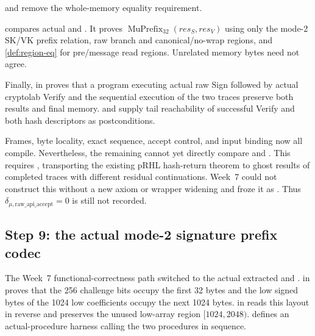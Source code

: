  and
 remove the whole-memory equality requirement.

\begin{verified}
\label{thm:region-local-mu}
 compares actual
 and . It proves
\(\operatorname{MuPrefix}_{32}(res_S,res_V)\) using only the mode-2 SK/VK prefix
relation, raw branch and canonical/no-wrap regions, and
\cref{def:region-eq} for pre/message read regions. Unrelated memory bytes need
not agree.
\end{verified}

Finally,  in
 proves that a program executing actual
raw Sign followed by actual cryptolab Verify and the sequential execution of
the two traces preserve both results and final memory.
 and
 supply tail
reachability of successful Verify and both hash descriptors as postconditions.

Frames, byte locality, exact sequence, accept control, and input binding now all
compile. Nevertheless, the remaining  cannot yet
directly compare  and
. This requires
, transporting the existing pRHL hash-return theorem
to ghost results of completed traces with different residual continuations.
Week~7 could not construct this without a new axiom or wrapper widening and
froze it as \statusdeferred. Thus
\(\delta_{\mu,\mathrm{raw\_api\_accept}}=0\) is still not recorded.

\subsection{Step 9: the actual mode-2 signature prefix codec}

The Week~7 functional-correctness path switched to the actual extracted
 and .
 in
 proves that the 256 challenge bits
occupy the first 32 bytes and the low signed bytes of the 1024 low coefficients
occupy the next 1024 bytes.  in
 reads this layout in reverse and
preserves the unused low-array region \([1024,2048)\).
 defines an actual-procedure harness
calling the two procedures in sequence.

